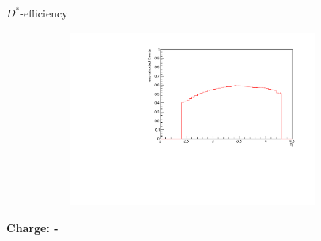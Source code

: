 \documentclass[11pt]{beamer}
\begin{document}
\begin{frame}{$D^*$-efficiency}
\begin{figure}
\begin{subfigure}{0.45\textwidth}
\end{subfigure}
\begin{subfigure}{0.45\textwidth}
\includegraphics[width=0.9\textwidth]{up_pdf/single/pos/h_eta_reco_Dst_pos.pdf}
\end{subfigure}
\end{figure}
\end{frame}
\begin{frame}
\begin{LARGE}
\textbf{Charge: -}
\end{LARGE}
\end{frame}
\end{document}
